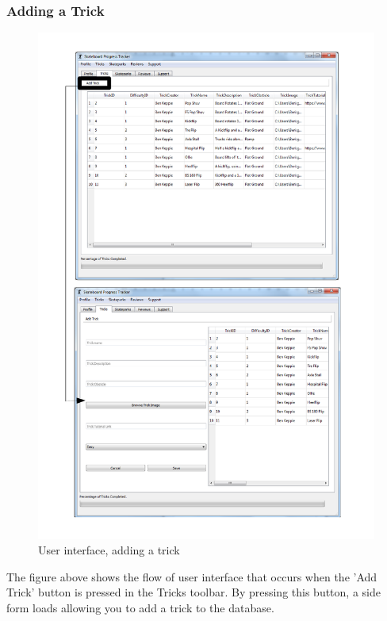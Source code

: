 \subsubsection{Adding a Trick}

\begin{figure}[H]
    \includegraphics[width=\textwidth]{./Maintenance/Figures/AddTrick.pdf}
    \caption{User interface, adding a trick} \label{fig:Add Trick UI}
\end{figure}

The figure above shows the flow of user interface that occurs when the 'Add Trick' button is pressed in the Tricks toolbar. By pressing this button, a side form loads allowing you to add a trick to the database.


